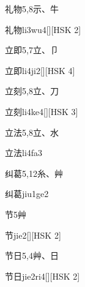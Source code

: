 \begin{entry}{礼物}{5,8}{⽰、⽜}
  \begin{phonetics}{礼物}{li3wu4}[][HSK 2]
  \end{phonetics}
\end{entry}

\begin{entry}{立即}{5,7}{⽴、⼙}
  \begin{phonetics}{立即}{li4ji2}[][HSK 4]
  \end{phonetics}
\end{entry}

\begin{entry}{立刻}{5,8}{⽴、⼑}
  \begin{phonetics}{立刻}{li4ke4}[][HSK 3]
  \end{phonetics}
\end{entry}

\begin{entry}{立法}{5,8}{⽴、⽔}
  \begin{phonetics}{立法}{li4fa3}
  \end{phonetics}
\end{entry}

\begin{entry}{纠葛}{5,12}{⽷、⾋}
  \begin{phonetics}{纠葛}{jiu1ge2}
  \end{phonetics}
\end{entry}

\begin{entry}{节}{5}{⾋}
  \begin{phonetics}{节}{jie2}[][HSK 2]
  \end{phonetics}
\end{entry}

\begin{entry}{节日}{5,4}{⾋、⽇}
  \begin{phonetics}{节日}{jie2ri4}[][HSK 2]
  \end{phonetics}
\end{entry}

